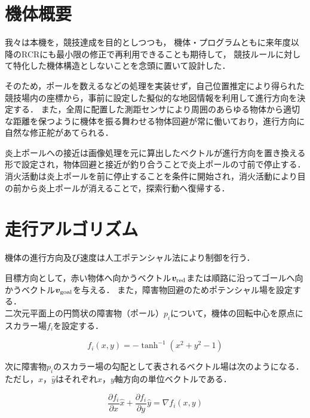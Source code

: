 \documentclass[11pt,a4]{jsarticle}
\begin{document}

\section{機体概要} 

  我々は本機を，競技達成を目的としつつも，
  機体・プログラムともに来年度以降のRCRにも最小限の修正で再利用できることも期待して，
  競技ルールに対して特化した機体構造としないことを念頭に置いて設計した．

  そのため，ポールを数えるなどの処理を実装せず，自己位置推定により得られた競技場内の座標から，事前に設定した擬似的な地図情報を利用して進行方向を決定する．
  また，全周に配置した測距センサにより周囲のあらゆる物体から適切な距離を保つように機体を振る舞わせる物体回避が常に働いており，進行方向に自然な修正舵があてられる．

  炎上ポールへの接近は画像処理を元に算出したベクトルが進行方向を置き換える形で設定され，物体回避と接近が釣り合うことで炎上ポールの寸前で停止する．
  消火活動は炎上ポールを前に停止することを条件に開始され，消火活動により目の前から炎上ポールが消えることで，探索行動へ復帰する．

\section{走行アルゴリズム} 

  機体の進行方向及び速度は人工ポテンシャル法により制御を行う．

  目標方向として，赤い物体へ向かうベクトル$\bm{v}_{\rm{red}}$または順路に沿ってゴールへ向かうベクトル$\bm{v}_{\rm{goal}}$を与える．
  また，障害物回避のためポテンシャル場を設定する．\\

  二次元平面上の円筒状の障害物（ポール）$p_i$について，機体の回転中心を原点にスカラー場$f_i$を設定する．

  \begin{equation}
    f_i(x,y) = - \tanh^{-1}(x^2 + y^2 - 1)
  \end{equation}

  次に障害物$p_i$のスカラー場の勾配として表されるベクトル場は次のようになる．
  ただし，$\hat{x}$，$\hat{y}$はそれぞれ$x$，$y$軸方向の単位ベクトルである．

  \begin{equation}
    \frac{\partial f_i}{\partial x}\hat{x} + \frac{\partial f_i}{\partial y}\hat{y} = \nabla f_i(x,y)
  \end{equation}
\end{document}

